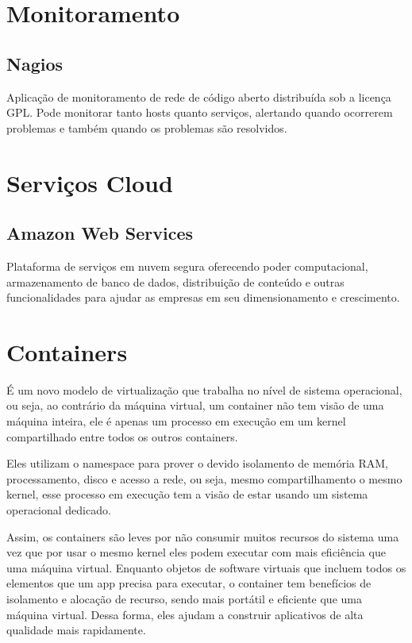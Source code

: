    \section{Monitoramento}

	\subsection{Nagios} Aplicação de monitoramento de rede de código 
	aberto distribuída sob a licença GPL. Pode monitorar tanto hosts 
	quanto serviços, alertando quando ocorrerem problemas e também 
	quando os problemas são resolvidos.

    \section{Serviços Cloud}

	\subsection{Amazon Web Services} Plataforma de serviços em nuvem 
	segura oferecendo poder computacional, armazenamento de banco de 
	dados, distribuição de conteúdo e outras funcionalidades para 
	ajudar as empresas em seu dimensionamento e crescimento.
	
\section{Containers}
É um novo modelo de virtualização que trabalha no nível de sistema operacional, 
ou seja, ao contrário da máquina virtual, um container não tem visão de uma 
máquina inteira, ele é apenas um processo em execução em um kernel compartilhado 
entre todos os outros containers.

Eles utilizam o namespace para prover o devido isolamento de memória RAM, 
processamento, disco e acesso a rede, ou seja, mesmo compartilhamento o 
mesmo kernel, esse processo em execução tem a visão de estar usando um 
sistema operacional dedicado.

Assim, os containers são leves por não consumir muitos recursos do 
sistema uma vez que por usar o mesmo kernel eles podem executar com 
mais eficiência que uma máquina virtual. Enquanto objetos de software 
virtuais que incluem todos os elementos que um app precisa para executar, 
o container tem benefícios de isolamento e alocação de recurso, sendo 
mais portátil e eficiente que uma máquina virtual. Dessa forma, eles 
ajudam a construir aplicativos de alta qualidade mais rapidamente.

